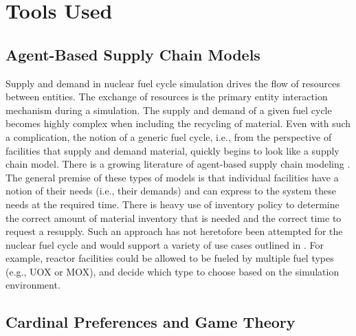 
\section{Tools Used}

\subsection{Agent-Based Supply Chain Models}\label{intro:sim}

Supply and demand in nuclear fuel cycle simulation drives the flow of resources
between entities. The exchange of resources is the primary entity interaction
mechanism during a simulation. The supply and demand of a given fuel cycle
becomes highly complex when including the recycling of material. Even with such
a complication, the notion of a generic fuel cycle, i.e., from the perspective
of facilities that supply and demand material, quickly begins to look like a
supply chain model. There is a growing literature of agent-based supply chain
modeling
\cite{swaminathan_modeling_1998,julka_agent-based_2002,van_der_zee_modeling_2005,chatfield_multi-formalism_2007,holmgren_agent_2007}.
The general premise of these types of models is that individual facilities have
a notion of their needs (i.e., their demands) and can express to the system
these needs at the required time. There is heavy use of inventory policy to
determine the correct amount of material inventory that is needed and the
correct time to request a resupply. Such an approach has not heretofore been
attempted for the nuclear fuel cycle and would support a variety of use cases
outlined in . For example, reactor facilities could be allowed
to be fueled by multiple fuel types (e.g., UOX or MOX), and decide which type to
choose based on the simulation environment.

\subsection{Cardinal Preferences and Game Theory}\label{intro:prefs}

